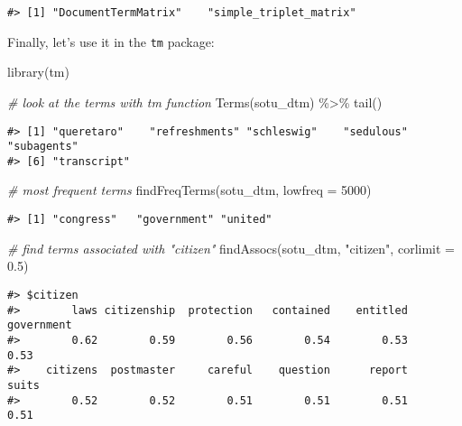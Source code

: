 \documentclass[
]{book}
\newenvironment{Shaded}{\begin{snugshade}}{\end{snugshade}}
\newcommand{\AttributeTok}[1]{\textcolor[rgb]{0.77,0.63,0.00}{#1}}
\newcommand{\CommentTok}[1]{\textcolor[rgb]{0.56,0.35,0.01}{\textit{#1}}}
\newcommand{\DecValTok}[1]{\textcolor[rgb]{0.00,0.00,0.81}{#1}}
\newcommand{\FloatTok}[1]{\textcolor[rgb]{0.00,0.00,0.81}{#1}}
\newcommand{\FunctionTok}[1]{\textcolor[rgb]{0.00,0.00,0.00}{#1}}
\newcommand{\NormalTok}[1]{#1}
\newcommand{\SpecialCharTok}[1]{\textcolor[rgb]{0.00,0.00,0.00}{#1}}
\newcommand{\StringTok}[1]{\textcolor[rgb]{0.31,0.60,0.02}{#1}}
\begin{document}
\begin{verbatim}
#> [1] "DocumentTermMatrix"    "simple_triplet_matrix"
\end{verbatim}

Finally, let's use it in the \texttt{tm} package:

\begin{Shaded}
\begin{Highlighting}[]
\FunctionTok{library}\NormalTok{(tm)}

\CommentTok{\# look at the terms with tm function}
\FunctionTok{Terms}\NormalTok{(sotu\_dtm) }\SpecialCharTok{\%\textgreater{}\%} \FunctionTok{tail}\NormalTok{()}
\end{Highlighting}
\end{Shaded}

\begin{verbatim}
#> [1] "queretaro"    "refreshments" "schleswig"    "sedulous"     "subagents"   
#> [6] "transcript"
\end{verbatim}

\begin{Shaded}
\begin{Highlighting}[]
\CommentTok{\# most frequent terms}
\FunctionTok{findFreqTerms}\NormalTok{(sotu\_dtm, }\AttributeTok{lowfreq =} \DecValTok{5000}\NormalTok{)}
\end{Highlighting}
\end{Shaded}

\begin{verbatim}
#> [1] "congress"   "government" "united"
\end{verbatim}

\begin{Shaded}
\begin{Highlighting}[]
\CommentTok{\# find terms associated with "citizen"}
\FunctionTok{findAssocs}\NormalTok{(sotu\_dtm, }\StringTok{"citizen"}\NormalTok{, }\AttributeTok{corlimit =} \FloatTok{0.5}\NormalTok{)}
\end{Highlighting}
\end{Shaded}

\begin{verbatim}
#> $citizen
#>        laws citizenship  protection   contained    entitled  government 
#>        0.62        0.59        0.56        0.54        0.53        0.53 
#>    citizens  postmaster     careful    question      report       suits 
#>        0.52        0.52        0.51        0.51        0.51        0.51
\end{verbatim}
\end{document}
